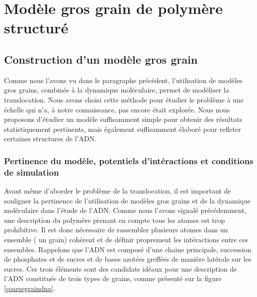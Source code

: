 \documentclass[a4paper,11pt]{article}
\begin{document}
\newpage



\section{Modèle gros grain de polymère structuré}

\subsection{Construction d'un modèle gros grain}

Comme nous l'avons vu dans le paragraphe précédent, l'utilisation de modèles gros grains, combinée à la dynamique moléculaire, permet de modéliser la translocation. Nous avons choisi cette méthode pour étudier le problème à une échelle qui n'a, à notre connaissance, pas encore était explorée. Nous nous proposons d'étudier un modèle suffisamment simple pour obtenir des résultats statistiquement pertinents, mais également suffisamment élaboré pour refleter certaines structures de l'ADN.

\subsubsection{Pertinence du modèle, potentiels d'intéractions et conditions de simulation}
Avant même d'aborder le problème de la translocation, il est important de souligner la pertinence de l'utilisation de modèles gros grains et de la dynamique moléculaire dans l'étude de l'ADN. Comme nous l'avons signalé précédemment, une description du polymère prenant en compte tous les atomes est trop prohibitive. Il est donc nécessaire de rassembler plusieurs atomes dans un ensemble ( un grain) cohérent et de définir proprement les intéractions entre ces ensembles. Rappelons que l'ADN est composé d'une chaine principale, succession de phosphates et de sucres et de bases azotées greffées de manière latérale sur les sucres. Ces trois éléments sont des candidats idéaux pour une description de l'ADN constituée de trois types de grains, comme présenté sur la figure \ref{coarsegraindna}.
\end{document}
